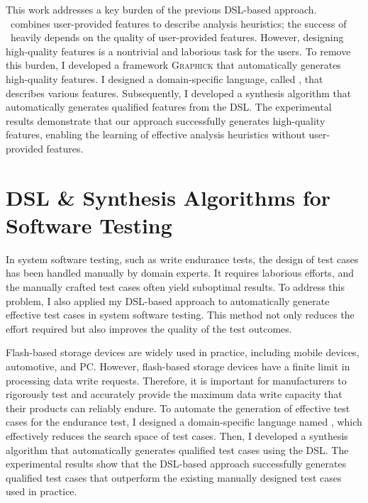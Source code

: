 \documentclass[11pt]{article}
\newcommand{\myparagraph}[1]{\medskip\noindent{\it \textbf{#1.}}}
\begin{document}
\myparagraph{Graphick~\cite{Jeon20}}
%
This work addresses a key burden of the previous DSL-based approach. 
%
\DisjunctiveModel~combines user-provided features to describe analysis heuristics; the success of \DisjunctiveModel~heavily depends on the quality of user-provided features.
%
However, designing high-quality features is a nontrivial and laborious task for the users.
%
To remove this burden, I developed a framework \textsc{Graphick} that automatically generates high-quality features.
%
I designed a domain-specific language, called \FeatureLanguage, that describes various features.
%
Subsequently, I developed a synthesis algorithm that automatically generates qualified features from the DSL.
%
The experimental results demonstrate that our approach successfully generates high-quality features, enabling the learning of effective analysis heuristics without user-provided features.




\section{DSL \& Synthesis Algorithms for Software Testing}
%
In system software testing, such as write endurance tests, the design of test cases has been handled manually by domain experts. 
It requires laborious efforts, and the manually crafted test cases often yield suboptimal results.
%
To address this problem, I also applied my DSL-based approach to automatically generate effective test cases in system software testing.
%
This method not only reduces the effort required but also improves the quality of the test outcomes.




\myparagraph{ARES~\cite{ARES23}}
%
Flash-based storage devices are widely used in practice, including mobile devices, automotive, and PC. 
%
However, flash-based storage devices have a finite limit in processing data write requests.
%
Therefore, it is important for manufacturers to rigorously test and accurately provide the maximum data write capacity that their products can reliably endure.
%
To automate the generation of effective test cases for the endurance test, I designed a domain-specific language named \AbstractRelativeWritePattern, which effectively reduces the search space of test cases.
%
Then, I developed a synthesis algorithm that automatically generates qualified test cases using the DSL.
%
The experimental results show that the DSL-based approach successfully generates qualified test cases that outperform the existing manually designed test cases used in practice.
\end{document}
